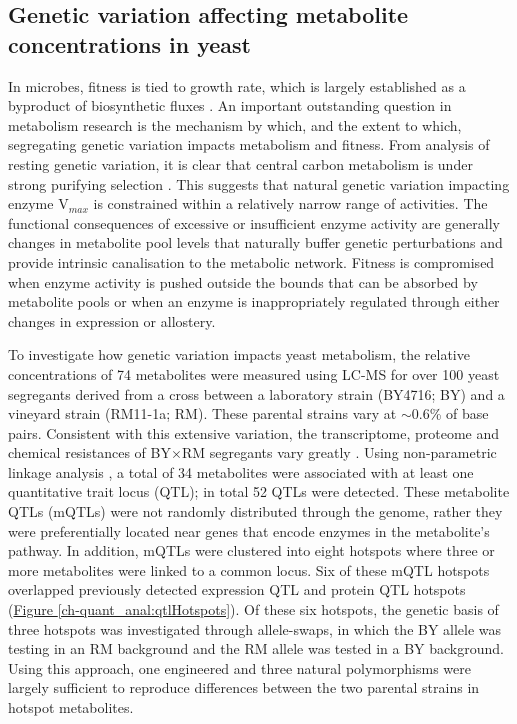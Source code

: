 \subsection{Genetic variation affecting metabolite concentrations in yeast \label{ch:quant_analysis:mQTL}}

In microbes, fitness is tied to growth rate, which is largely established as a byproduct of biosynthetic fluxes \cite{Dykhuizen:1987uq, Edwards:2001hj}. An important outstanding question in metabolism research is the mechanism by which, and the extent to which, segregating genetic variation impacts metabolism and fitness.  From analysis of resting genetic variation, it is clear that central carbon metabolism is under strong purifying selection \cite{Greenberg:2008uy}. This suggests that natural genetic variation impacting enzyme V$_{max}$ is constrained within a relatively narrow range of activities. The functional consequences of excessive or insufficient enzyme activity are generally changes in metabolite pool levels that naturally buffer genetic perturbations \cite{Fendt:2010gr} and provide intrinsic canalisation to the metabolic network. Fitness is compromised when enzyme activity is pushed outside the bounds that can be absorbed by metabolite pools or when an enzyme is inappropriately regulated through either changes in expression or allostery. 

To investigate how genetic variation impacts yeast metabolism, the relative concentrations of 74 metabolites were measured using LC-MS for over 100 yeast segregants derived from a cross between a laboratory strain (BY4716; BY) and a vineyard strain (RM11-1a; RM). These parental strains vary at $\sim$0.6\% of base pairs. Consistent with this extensive variation, the transcriptome, proteome and chemical resistances of BY$\times$RM segregants vary greatly \cite{Brem:2005gh, Foss:2007ej, Bloom:2013bq}. Using non-parametric linkage analysis \cite{Broman:2003wq}, a total of 34 metabolites were associated with at least one quantitative trait locus (QTL); in total 52 QTLs were detected.  These metabolite QTLs (mQTLs) were not randomly distributed through the genome, rather they were preferentially located near genes that encode enzymes in the metabolite's pathway. In addition, mQTLs were clustered into eight hotspots where three or more metabolites were linked to a common locus. Six of these mQTL hotspots overlapped previously detected expression QTL and protein QTL hotspots (\hyperref[ch-quant_anal:qtlHotspots]{Figure \ref{ch-quant_anal:qtlHotspots}}). Of these six hotspots, the genetic basis of three hotspots was investigated through allele-swaps, in which the BY allele was testing in an RM background and the RM allele was tested in a BY background. Using this approach, one engineered and three natural polymorphisms were largely sufficient to reproduce differences between the two parental strains in hotspot metabolites. 

